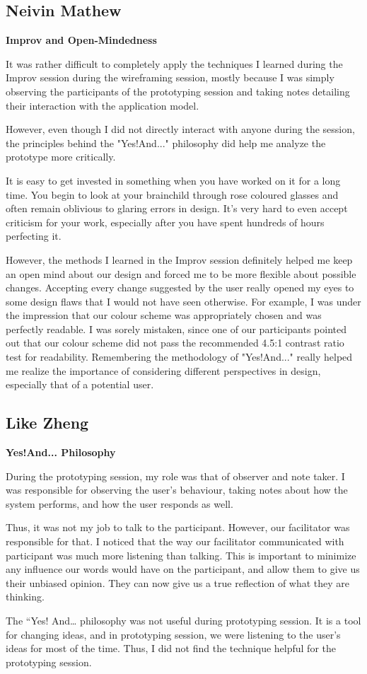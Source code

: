 \documentclass[12pt,letterpaper]{article}
\begin{document}
\subsection{Neivin Mathew}
\textbf{Improv and Open-Mindedness}\par
It was rather difficult to completely apply the techniques I learned during the Improv session during the wireframing session, mostly because I was simply observing the participants of the prototyping session and taking notes detailing their interaction with the application model.\par
However, even though I did not directly interact with anyone during the session, the principles behind the "Yes!And..." philosophy did help me analyze the prototype more critically.\par 
It is easy to get invested in something when you have worked on it for a long time. You begin to look at your brainchild through rose coloured glasses and often remain oblivious to glaring errors in design. It's very hard to even accept criticism for your work, especially after you have spent hundreds of hours perfecting it. \par
However, the methods I learned in the Improv session definitely helped me keep an open mind about our design and forced me to be more flexible about possible changes. Accepting every change suggested by the user really opened my eyes to some design flaws that I would not have seen otherwise. For example, I was under the impression that our colour scheme was appropriately chosen and was perfectly readable. I was sorely mistaken, since one of our participants pointed out that our colour scheme did not pass the recommended 4.5:1 contrast ratio test for readability. Remembering the methodology of "Yes!And..." really helped me realize the importance of considering different perspectives in design, especially that of a potential user. 

		
	
\clearpage
\subsection{Like Zheng}
\textbf{Yes!And... Philosophy}\par
During the prototyping session, my role was that of observer and note taker. I was responsible for observing the user's behaviour, taking notes about how the system performs, and how the user responds as well.\par
Thus, it was not my job to talk to the participant. However, our facilitator was responsible for that. I noticed that the way our facilitator communicated with participant was much more listening than talking. This is important to minimize any influence our words would have on the participant, and allow them to give us their unbiased opinion. They can now give us a true reflection of what they are thinking.\par 
The “Yes! And… philosophy was not useful during prototyping session. It is a tool for changing ideas, and in prototyping session, we were listening to the user's ideas for most of the time. Thus, I did not find the technique helpful for the prototyping session. 
\end{document}
